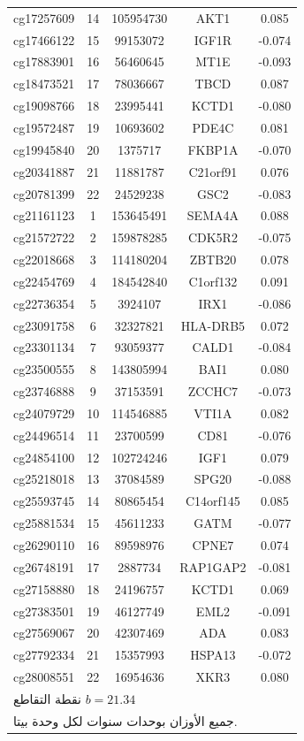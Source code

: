\documentclass[11pt,a4paper]{article}
\begin{document}
\begin{longtable}{|c|c|c|c|c|}
		cg17257609 & 14 & 105954730 & AKT1 & 0.085 \\
		cg17466122 & 15 & 99153072 & IGF1R & -0.074 \\
		cg17883901 & 16 & 56460645 & MT1E & -0.093 \\
		cg18473521 & 17 & 78036667 & TBCD & 0.087 \\
		cg19098766 & 18 & 23995441 & KCTD1 & -0.080 \\
		cg19572487 & 19 & 10693602 & PDE4C & 0.081 \\
		cg19945840 & 20 & 1375717 & FKBP1A & -0.070 \\
		cg20341887 & 21 & 11881787 & C21orf91 & 0.076 \\
		cg20781399 & 22 & 24529238 & GSC2 & -0.083 \\
		cg21161123 & 1 & 153645491 & SEMA4A & 0.088 \\
		cg21572722 & 2 & 159878285 & CDK5R2 & -0.075 \\
		cg22018668 & 3 & 114180204 & ZBTB20 & 0.078 \\
		cg22454769 & 4 & 184542840 & C1orf132 & 0.091 \\
		cg22736354 & 5 & 3924107 & IRX1 & -0.086 \\
		cg23091758 & 6 & 32327821 & HLA-DRB5 & 0.072 \\
		cg23301134 & 7 & 93059377 & CALD1 & -0.084 \\
		cg23500555 & 8 & 143805994 & BAI1 & 0.080 \\
		cg23746888 & 9 & 37153591 & ZCCHC7 & -0.073 \\
		cg24079729 & 10 & 114546885 & VTI1A & 0.082 \\
		cg24496514 & 11 & 23700599 & CD81 & -0.076 \\
		cg24854100 & 12 & 102724246 & IGF1 & 0.079 \\
		cg25218018 & 13 & 37084589 & SPG20 & -0.088 \\
		cg25593745 & 14 & 80865454 & C14orf145 & 0.085 \\
		cg25881534 & 15 & 45611233 & GATM & -0.077 \\
		cg26290110 & 16 & 89598976 & CPNE7 & 0.074 \\
		cg26748191 & 17 & 2887734 & RAP1GAP2 & -0.081 \\
		cg27158880 & 18 & 24196757 & KCTD1 & 0.069 \\
		cg27383501 & 19 & 46127749 & EML2 & -0.091 \\
		cg27569067 & 20 & 42307469 & ADA & 0.083 \\
		cg27792334 & 21 & 15357993 & HSPA13 & -0.072 \\
		cg28008551 & 22 & 16954636 & XKR3 & 0.080 \\
		\hline
		\multicolumn{5}{l}{\footnotesize نقطة التقاطع \(b = 21.34\)} \\
		\multicolumn{5}{l}{\footnotesize جميع الأوزان بوحدات سنوات لكل وحدة بيتا.} \\
	\end{longtable}
	
\end{document}
